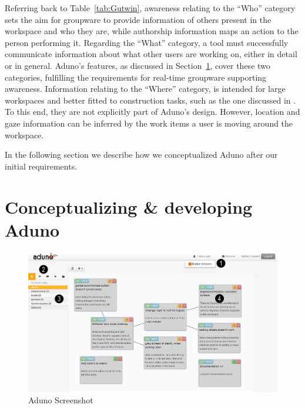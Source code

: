 \documentclass[conference]{IEEEtran}
\begin{document}
Referring back to Table~\ref{tab:Gutwin}, awareness relating to the ``Who'' category sets the aim for groupware to provide information of others present in the workspace and who they are, while authorship information maps an action to the person performing it. Regarding the ``What'' category, a tool must successfully communicate information about what other users are working on, either in detail or in general. Aduno's features, as discussed in Section~\ref{sec:concept}, cover these two categories, fulfilling the requirements for real-time groupware supporting awareness. Information relating to the ``Where'' category, is intended for large workspaces and better fitted to construction tasks, such as the one discussed in \cite{GRG96}. To this end, they are not explicitly part of Aduno's design. However, location and gaze information can be inferred by the work items a user is moving around the workspace.

In the following section we describe how we conceptualized Aduno after our initial requirements.

\section{Conceptualizing \& developing Aduno}
\label{sec:concept}

\begin{figure}[t]
\includegraphics[width=\textwidth]{aduno-screenshot}
\caption{Aduno Screenshot}
\label{fig:adunoscreenshot}
\end{figure}
\end{document}
